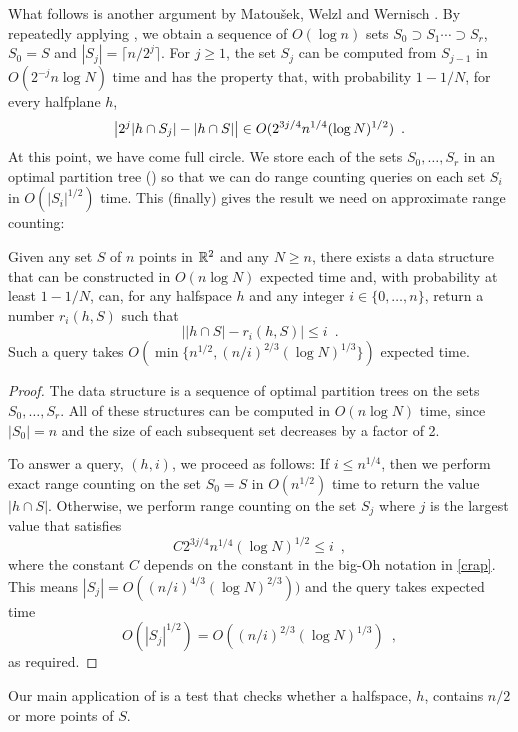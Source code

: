\documentclass{patmorin}
\begin{document}
What follows is another argument by Matou\v{s}ek, Welzl and Wernisch
\cite[Lemma~2.2]{mww93}.  By repeatedly applying , we
obtain a sequence of $O(\log n)$ sets $S_0\supset S_1\cdots\supset S_r$,
$S_0=S$ and $|S_j|=\lceil n/2^j\rceil$.  For $j\ge 1$, the set $S_j$
can be computed from $S_{j-1}$ in $O(2^{-j}n\log N)$ time and has the
property that, with probability $1-1/N$, for every halfplane $h$,
\begin{equation}
   \left|2^j|h\cap S_j| - |h\cap S|\right| \in O(2^{3j/4}n^{1/4}(\log N)^{1/2}) \enspace .
  \eqlabel{crap}
\end{equation}
At this point, we have come full circle.  We store each
of the sets $S_0,\ldots,S_r$ in an optimal partition tree
() so that we can do range counting
queries on each set $S_i$ in $O(|S_i|^{1/2})$ time.  This (finally)
gives the result we need on approximate range counting:
\begin{lem}
  Given any set $S$ of $n$ points in $\mathbb{R}^2$ and any $N\ge n$, there exists
  a data structure that can be constructed in $O(n\log N)$ expected time
  and, with probability at least $1-1/N$, can, for any halfspace $h$
  and any integer $i\in\{0,\ldots,n\}$, return a number $r_i(h,S)$ such that
  \[  \left||h\cap S|-r_i(h,S)\right| \le i \enspace .\]
  Such a query takes $O(\min\{n^{1/2},(n/i)^{2/3}(\log N)^{1/3}\})$ expected time.
\end{lem}

\begin{proof}
  The data structure is a sequence of optimal partition trees on the
  sets $S_0,\ldots,S_r$.  All of these structures can be computed in
  $O(n\log N)$ time, since $|S_0|=n$ and the size of each subsequent
  set decreases by a factor of 2.

  To answer a query, $(h,i)$, we proceed as follows: If $i\le n^{1/4}$,
  then we perform exact range counting on the set $S_0=S$ in $O(n^{1/2})$
  time to return the value $|h\cap S|$.  Otherwise, we perform range
  counting on the set $S_j$ where $j$ is the largest value that satisfies
  \[
      C2^{3j/4} n^{1/4}(\log N)^{1/2} \le i \enspace ,
  \]
  where the constant $C$ depends on the constant in the big-Oh notation
  in \eqref{crap}.  This means $|S_j| = O((n/i)^{4/3}(\log N)^{2/3}))$
  and the query takes expected time
  \[
      O(|S_j|^{1/2}) = O((n/i)^{2/3}(\log N)^{1/3}) \enspace ,
  \]
   as required.
\end{proof}

Our main application of  is a test that
checks whether a halfspace, $h$, contains $n/2$ or more points of $S$.
\end{document}
